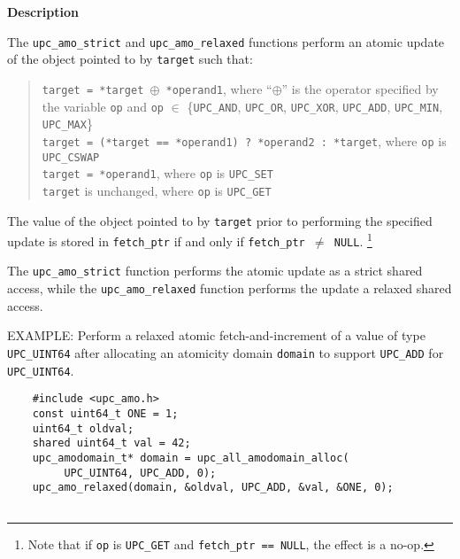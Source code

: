 {\bf Description}

\np The {\tt upc\_amo\_strict} and {\tt upc\_amo\_relaxed} functions perform
    an atomic update of the object pointed to by {\tt target} such that:

    \begin{verse}
      {\tt *target = *target $\oplus$ *operand1},
        where ``$\oplus$'' is the operator specified by the variable {\tt op}
        and {\tt op} $\in$ \{{\tt UPC\_AND}, {\tt UPC\_OR}, {\tt UPC\_XOR},
        {\tt UPC\_ADD}, {\tt UPC\_MIN}, {\tt UPC\_MAX}\} \\
      {\tt *target = (*target == *operand1) ? *operand2 : *target},
        where {\tt op} is {\tt UPC\_CSWAP} \\
      {\tt *target = *operand1},
        where {\tt op} is {\tt UPC\_SET} \\
      {\tt *target} is unchanged,
        where {\tt op} is {\tt UPC\_GET} \\
    \end{verse}

\np The value of the object pointed to by {\tt target} prior to performing
    the specified update is stored in {\tt fetch\_ptr} if and only if
    {\tt fetch\_ptr $\neq$ NULL}.%
    \footnote{Note that if {\tt op} is {\tt UPC\_GET} and
              {\tt fetch\_ptr == NULL}, the effect is a no-op.}

\np The {\tt upc\_amo\_strict} function performs the atomic update as a strict
    shared access, while the {\tt upc\_amo\_relaxed} function performs the
    update a relaxed shared access.

\np EXAMPLE: Perform a relaxed atomic fetch-and-increment of a value of type
    {\tt UPC\_UINT64} after allocating an atomicity domain {\tt domain} to
    support {\tt UPC\_ADD} for {\tt UPC\_UINT64}.
\begin{verbatim}
    #include <upc_amo.h>
    const uint64_t ONE = 1;
    uint64_t oldval;
    shared uint64_t val = 42;
    upc_amodomain_t* domain = upc_all_amodomain_alloc(
         UPC_UINT64, UPC_ADD, 0);
    upc_amo_relaxed(domain, &oldval, UPC_ADD, &val, &ONE, 0);
    
\end{verbatim}
